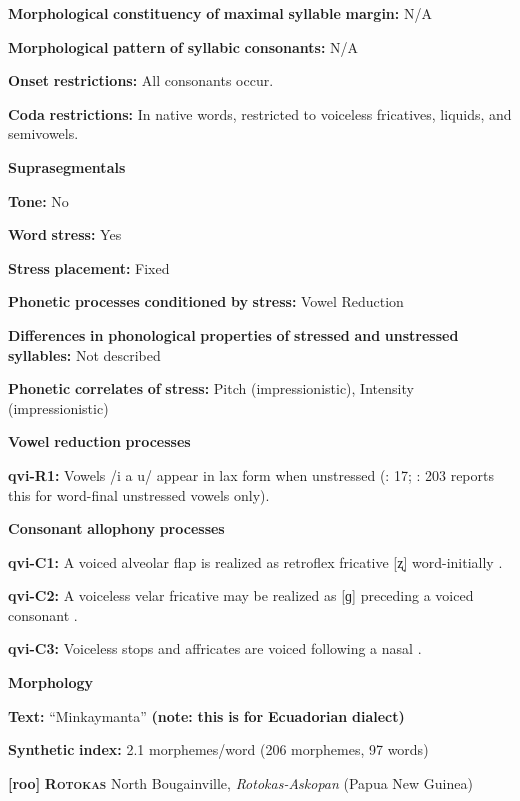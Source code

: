 \textbf{Morphological} \textbf{constituency} \textbf{of} \textbf{maximal} \textbf{syllable} \textbf{margin:} N/A

\textbf{Morphological} \textbf{pattern} \textbf{of} \textbf{syllabic} \textbf{consonants:} N/A

\textbf{Onset} \textbf{restrictions:} All consonants occur.

\textbf{Coda} \textbf{restrictions:} In native words, restricted to voiceless fricatives, liquids, and semivowels.

\textbf{Suprasegmentals}

\textbf{Tone:} No

\textbf{Word} \textbf{stress:} Yes

\textbf{Stress} \textbf{placement:} Fixed

\textbf{Phonetic} \textbf{processes} \textbf{conditioned} \textbf{by} \textbf{stress:} Vowel Reduction

\textbf{Differences} \textbf{in} \textbf{phonological} \textbf{properties} \textbf{of} \textbf{stressed} \textbf{and} \textbf{unstressed} \textbf{syllables:} Not described

\textbf{Phonetic} \textbf{correlates} \textbf{of} \textbf{stress:} Pitch (impressionistic), Intensity (impressionistic)

\textbf{Vowel} \textbf{reduction} \textbf{processes}

\textbf{qvi-R1:} Vowels /i a u/ appear in lax form when unstressed (\citealt{Jake1983}: 17; \citealt{Cole1982}: 203 reports this for word-final unstressed vowels only).

\textbf{Consonant} \textbf{allophony} \textbf{processes}

\textbf{qvi-C1:} A voiced alveolar flap is realized as retroflex fricative [ʐ] word-initially \citep[202]{Cole1982}.

\textbf{qvi-C2:} A voiceless velar fricative may be realized as [ɡ] preceding a voiced consonant \citep[201]{Cole1982}.

\textbf{qvi-C3:} Voiceless stops and affricates are voiced following a nasal \citep[200]{Cole1982}.

\textbf{Morphology}

\textbf{Text:} “Minkaymanta” \citep[442-55]{Carpenter1982} \textbf{(note:} \textbf{this} \textbf{is} \textbf{for} \textbf{Ecuadorian} \textbf{dialect)}

\textbf{Synthetic} \textbf{index:} 2.1 morphemes/word (206 morphemes, 97 words)

\textbf{[roo]}   \textbf{\textsc{Rotokas}}  North Bougainville, \textit{Rotokas-Askopan} (Papua New Guinea)

